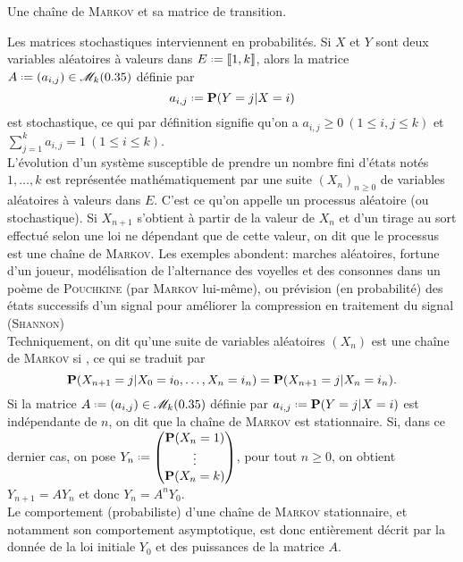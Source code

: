 
\begin{marginfigure}[3cm]
    \centering
    
    \caption*{\centering Une chaîne de \textsc{Markov} et sa matrice de transition.}
\end{marginfigure}

Les matrices stochastiques interviennent en probabilités. Si $X$ et $Y$ sont deux variables aléatoires à valeurs dans $E \defeq \llbracket 1, k \rrbracket$, alors la matrice $A \defeq (a_{i,j}) \in \M_k(\R)$ définie par 
$$a_{i,j} \defeq \P(Y = j | X = i)$$
est stochastique, ce qui par définition signifie qu'on a $a_{i,j} \geqslant 0\ (1 \leqslant i, j \leqslant k)$ et $\sum\limits_{j=1}^k a_{i,j} = 1\ (1 \leqslant i \leqslant k)$. \\
L'évolution d'un système susceptible de prendre un nombre fini d'états notés $1, \dots, k$ est représentée mathématiquement par une suite $(X_n)_{n \geqslant 0}$ de variables aléatoires à valeurs dans $E$. C'est ce qu'on appelle un processus aléatoire (ou stochastique). Si $X_{n+1}$ s'obtient à partir de la valeur de $X_n$ et d'un tirage au sort effectué selon une loi ne dépendant que de cette valeur, on dit que le processus est une chaîne de \textsc{Markov}. Les exemples abondent: marches aléatoires, fortune d'un joueur, modélisation de l'alternance des voyelles et des consonnes dans un poème de \textsc{Pouchkine} (par \textsc{Markov} lui-même), ou prévision (en probabilité) des états  successifs d'un signal pour améliorer la compression en traitement du signal (\textsc{Shannon}) \\
Techniquement, on dit qu'une suite de variables aléatoires $(X_n)$ est une chaîne de \textsc{Markov} si , ce qui se traduit par
$$\P(X_{n+1}=j | X_0=i_0, \dots, X_n = i_n) = \P(X_{n+1} = j | X_n = i_n).$$
Si la matrice $A \defeq (a_{i,j}) \in \M_k(\R)$ définie par $a_{i,j} \defeq \P(Y = j | X = i)$ est indépendante de $n$, on dit que la chaîne de \textsc{Markov} est stationnaire. Si, dans ce dernier cas, on pose $Y_n \defeq \begin{pmatrix} \P(X_n = 1) \\ \vdots \\ \P(X_n = k) \end{pmatrix}$, pour tout $n \geqslant 0$, on obtient $Y_{n+1} = A Y_n$ et donc $Y_n = A^n Y_0$. \\
Le comportement (probabiliste) d'une chaîne de \textsc{Markov} stationnaire, et notamment son comportement asymptotique, est donc entièrement décrit par la donnée de la loi initiale $Y_0$ et des puissances de la matrice $A$. 

